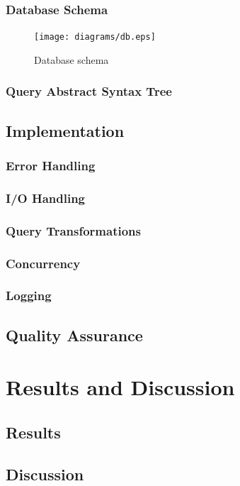 \documentclass[a4paper,oneside,12pt]{book}
\begin{document}
\subsection{Database Schema}
\begin{figure}
  \texttt{[image: diagrams/db.eps]}
  \caption{Database schema}
  \label{db}
\end{figure}

\subsection{Query Abstract Syntax Tree}

\section{Implementation}
\subsection{Error Handling}
\subsection{I/O Handling}
\subsection{Query Transformations}
\subsection{Concurrency}
\subsection{Logging}

\section{Quality Assurance}

\chapter{Results and Discussion}
\section{Results}
\section{Discussion}
\end{document}
